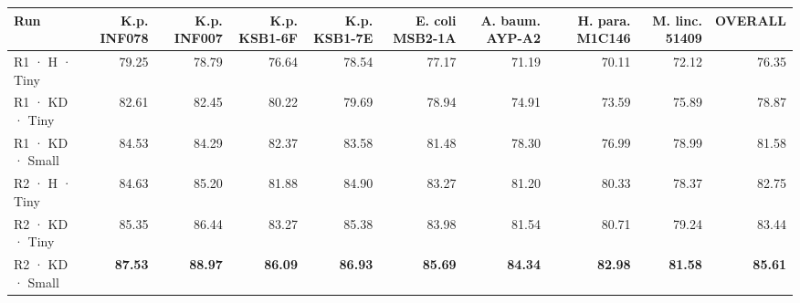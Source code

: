 \begin{tabular}{lrrrrrrrrr}
\toprule
Run & K.p. INF078 & K.p. INF007 & K.p. KSB1-6F & K.p. KSB1-7E & E. coli MSB2-1A & A. baum. AYP-A2 & H. para. M1C146 & M. linc. 51409 & OVERALL \\
\midrule
R1 · H · Tiny & 79.25 & 78.79 & 76.64 & 78.54 & 77.17 & 71.19 & 70.11 & 72.12 & 76.35 \\
R1 · KD · Tiny & 82.61 & 82.45 & 80.22 & 79.69 & 78.94 & 74.91 & 73.59 & 75.89 & 78.87 \\
R1 · KD · Small & 84.53 & 84.29 & 82.37 & 83.58 & 81.48 & 78.30 & 76.99 & 78.99 & 81.58 \\
R2 · H · Tiny & 84.63 & 85.20 & 81.88 & 84.90 & 83.27 & 81.20 & 80.33 & 78.37 & 82.75 \\
R2 · KD · Tiny & 85.35 & 86.44 & 83.27 & 85.38 & 83.98 & 81.54 & 80.71 & 79.24 & 83.44 \\
R2 · KD · Small & \textbf{87.53} & \textbf{88.97} & \textbf{86.09} & \textbf{86.93} & \textbf{85.69} & \textbf{84.34} & \textbf{82.98} & \textbf{81.58} & \textbf{85.61} \\
\bottomrule
\end{tabular}
